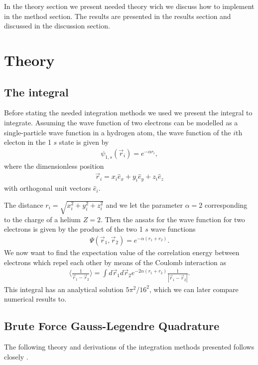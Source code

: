 \documentclass[10pt, twocolumn]{aastex62}
\begin{document}
In the theory section we present needed theory wich we discuss how to implement
in the method section. The results are presented in the results section and
discussed in the discussion section.

\section{Theory} \label{sec:theory}
\subsection{The integral}\label{subsec:integral}
Before stating the needed integration methods we used we present the integral to
integrate. Assuming the wave function of two electrons can be modelled as a
single-particle wave function in a hydrogen atom, the wave function of the $i$th
electon in the 1 $s$ state is given by 
\begin{align}
	\psi_{1,s}(\vec{r}_i) = e^{-\alpha r_i},
\end{align}
where the dimensionless position
\begin{align}
	\vec{r}_i = x_i \hat{e}_x + y_i\hat{e}_y + z_i\hat{e}_z
\end{align} 
with orthogonal unit vectors $\hat{e}_i$.

The distance $r_i = \sqrt{x_i^2 + y_i^2 + z_i^2}$ and we let the parameter
$\alpha = 2$ corresponding to the charge of a helium $Z = 2$. Then the ansats
for the wave function for two electrons is given by the product of the two 1 $s$
wave functions 
\begin{align}
	\Psi(\vec{r}_1, \vec{r}_2) = e^{-\alpha(r_1 + r_2)}.
\end{align}
We now want to find the expectation value of the correlation energy between
electrons which repel each other by means of the Coulomb interaction as 
\begin{align}
\langle \frac{
1}{\vec{r}_1 - \vec{r}_2}\rangle = \int d\vec{r}_1d\vec{r}_2 e^{-2\alpha(r_1 + r_2)}\frac{1}{|\vec{r}_1 - \vec{r}_2|}.
\label{eq:integral}
\end{align}
This integral has an analytical solution $5\pi^2/16^2$, which we can later
compare numerical results to.
\subsection{Brute Force Gauss-Legendre Quadrature}\label{subsec:brute_force_gauss}
The following theory and derivations of the integration methods presented
follows closely \citep[Ch. 5.3]{jensen:2015}. 
\end{document}

